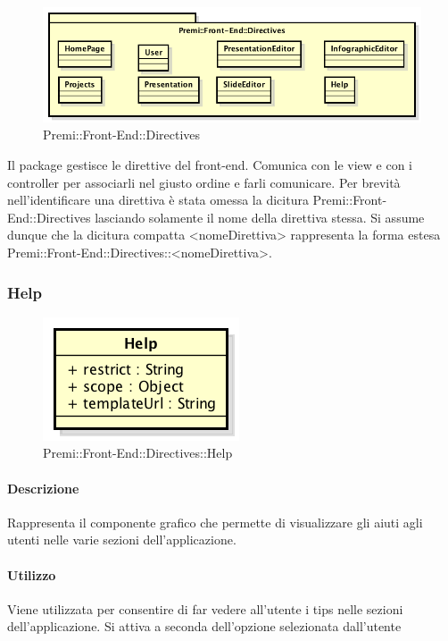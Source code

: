 \begin{figure}[h]
	\centering
	\includegraphics[width=0.7\linewidth]{img/premi_front_end_directives}
	\caption[Premi::Front-End::Directives]{Premi::Front-End::Directives}
\end{figure}
Il package gestisce le direttive del front-end. Comunica con le view e con i controller per associarli nel giusto ordine e farli comunicare.
Per brevità nell'identificare una direttiva è stata omessa la dicitura Premi::Front-End::Directives lasciando solamente il nome della direttiva stessa. Si assume dunque che la dicitura compatta <nomeDirettiva> rappresenta la forma estesa Premi::Front-End::Directives::<nomeDirettiva>.
\newpage


\subsubsection{Help}
	\begin{figure}[h]
		\centering
		\includegraphics[width=0.5\linewidth]{img/premi_front_end_directives_help}
		\caption[Premi::Front-End::Directives::Help]{Premi::Front-End::Directives::Help}
	\end{figure}
	
	\paragraph{Descrizione}
	Rappresenta il componente grafico che permette di visualizzare gli aiuti agli utenti nelle varie sezioni dell'applicazione.
	
	\paragraph{Utilizzo}
	Viene utilizzata per consentire di far vedere all'utente i tips nelle sezioni dell'applicazione. Si attiva a seconda dell'opzione selezionata dall'utente
	
